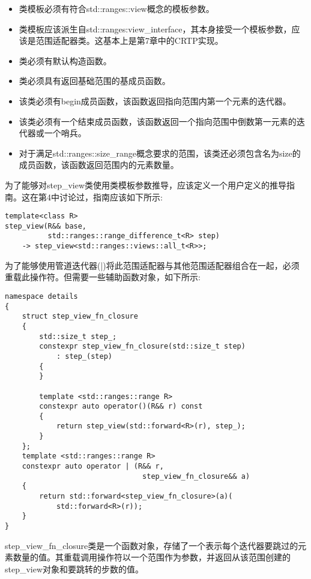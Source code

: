 \begin{itemize}
\item
类模板必须有符合std::ranges::view概念的模板参数。

\item
类模板应该派生自std::ranges:view\_interface，其本身接受一个模板参数，应该是范围适配器类。这基本上是第7章中的CRTP实现。

\item
类必须有默认构造函数。

\item
类必须具有返回基础范围的基成员函数。

\item
该类必须有begin成员函数，该函数返回指向范围内第一个元素的迭代器。

\item
该类必须有一个结束成员函数，该函数返回一个指向范围中倒数第一元素的迭代器或一个哨兵。

\item
对于满足std::ranges::size\_range概念要求的范围，该类还必须包含名为size的成员函数，该函数返回范围内的元素数量。
\end{itemize}

为了能够对step\_view类使用类模板参数推导，应该定义一个用户定义的推导指南。这在第4中讨论过，指南应该如下所示:

\begin{lstlisting}[style=styleCXX]
template<class R>
step_view(R&& base,
		  std::ranges::range_difference_t<R> step)
	-> step_view<std::ranges::views::all_t<R>>;
\end{lstlisting}

为了能够使用管道迭代器(|)将此范围适配器与其他范围适配器组合在一起，必须重载此操作符。但需要一些辅助函数对象，如下所示:

\begin{lstlisting}[style=styleCXX]
namespace details
{
	struct step_view_fn_closure
	{
		std::size_t step_;
		constexpr step_view_fn_closure(std::size_t step)
			: step_(step)
		{
		}
	
		template <std::ranges::range R>
		constexpr auto operator()(R&& r) const
		{
			return step_view(std::forward<R>(r), step_);
		}
	};
	template <std::ranges::range R>
	constexpr auto operator | (R&& r,
								step_view_fn_closure&& a)
	{
		return std::forward<step_view_fn_closure>(a)(
			std::forward<R>(r));
	}
}
\end{lstlisting}

step\_view\_fn\_closure类是一个函数对象，存储了一个表示每个迭代器要跳过的元素数量的值。其重载调用操作符以一个范围作为参数，并返回从该范围创建的step\_view对象和要跳转的步数的值。

